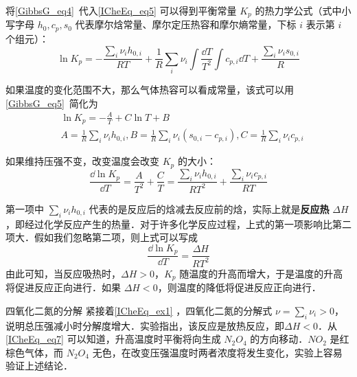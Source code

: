 将\autoref{GibbsG_eq4}~代入\autoref{ICheEq_eq5} 可以得到平衡常量 $K_p$ 的热力学公式（式中小写字母 $h_0,c_p,s_0$ 代表摩尔焓常量、摩尔定压热容和摩尔熵常量，下标 $i$ 表示第 $i$ 个组元）：
\begin{equation}
\ln K_p=-\frac{\sum_i \nu_i h_{0,i}}{RT}+\frac{1}{R}\sum_i\nu_i\int \frac{\dd T}{T^2}\int c_{p,i}\dd T + \frac{\sum_i \nu_i s_{0,i}}{R}
\end{equation}

如果温度的变化范围不大，那么气体热容可以看成常量，该式可以用\autoref{GibbsG_eq5}~简化为
\begin{equation}
\begin{aligned}
&\ln K_p=-\frac{A}{T}+C\ln T+B\\
&A=\frac{1}{R} \sum_i \nu_i h_{0,i},B=\frac{1}{R}\sum_i \nu_i(s_{0,i}-c_{p,i}),C=\frac{1}{R}\sum_i \nu_ic_{p,i}
\end{aligned}
\end{equation}

如果维持压强不变，改变温度会改变 $K_p$ 的大小：
\begin{equation}
\frac{\dd \ln K_p}{\dd T}=\frac{A}{T^2}+\frac{C}{T}=\frac{\sum_i\nu_ih_{0,i}}{RT^2}+\frac{\sum_i\nu_ic_{p,i}}{RT}
\end{equation}

第一项中 $\sum_i \nu_i h_{0,i}$ 代表的是反应后的焓减去反应前的焓，实际上就是\textbf{反应热} $\Delta H$，即经过化学反应产生的热量．对于许多化学反应过程，上式的第一项影响比第二项大．假如我们忽略第二项，则上式可以写成
\begin{equation}\label{ICheEq_eq7}
\frac{\dd \ln K_p}{\dd T}=\frac{\Delta H}{RT^2}
\end{equation}
由此可知，当反应吸热时，$\Delta H>0$，$K_p$ 随温度的升高而增大，于是温度的升高将促进反应正向进行．如果 $\Delta H<0$，则温度的降低将促进反应正向进行．
\begin{example}{四氧化二氮的分解}
紧接着\autoref{ICheEq_ex1} ，四氧化二氮的分解式 $\nu=\sum_i\nu_i>0$，说明总压强减小时分解度增大．实验指出，该反应是放热反应，即$\Delta H<0$．从\autoref{ICheEq_eq7} 可以知道，升高温度时平衡将向生成 $N_2O_4$ 的方向移动．$NO_2$ 是红棕色气体，而 $N_2O_4$ 无色，在改变压强温度时两者浓度将发生变化，实验上容易验证上述结论． 
\end{example}
